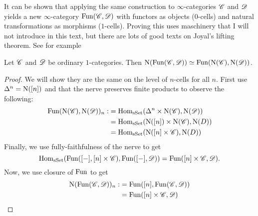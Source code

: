 \documentclass[../../thesis.tex]{subfiles}
\begin{document}
It can be shown that applying the same construction to $\infty$-categories $\mathscr{C}$ and $\mathscr{D}$ yields a new $\infty$-category $\mathrm{Fun}(\mathscr{C}, \mathscr{D})$ with functors as objects ($0$-cells) and natural transformations as morphisms ($1$-cells).
Proving this uses maschinery that I will not introduce in this text, but there are lots of good texts on Joyal's lifting theorem.
See for example 
\begin{proposition}
    Let $\mathscr{C}$ and $\mathscr{D}$ be ordinary $1$-categories.
    Then $\mathrm{N}(\mathrm{Fun}(\mathscr{C}, \mathscr{D})) \simeq \mathrm{Fun}(\mathrm{N}(\mathscr{C}), \mathrm{N}(\mathscr{D}))$.
\end{proposition}
\begin{proof}
    We will show they are the same on the level of $n$-cells for all $n$.
    First use $\Delta^n = \mathrm{N}([n])$ and that the nerve preserves finite products to observe the following:
    \begin{align}
        \mathrm{Fun}(\mathrm{N}(\mathscr{C}), \mathrm{N}(\mathscr{D}))_n: & = \mathrm{Hom}_{\mathrm{sSet}}(\Delta^n \times \mathrm{N}(\mathscr{C}), \mathrm{N}(\mathscr{D}))  \\
                                        & = \mathrm{Hom}_{\mathrm{sSet}}(\mathrm{N}([n])\times \mathrm{N}(\mathscr{C}), \mathrm{N}(D)) \\
                                        & = \mathrm{Hom}_{\mathrm{sSet}}(\mathrm{N}([n]\times \mathscr{C}), \mathrm{N}(D))
    \end{align}
    Finally, we use fully-faithfulness of the nerve to get
    \[
        \mathrm{Hom}_{\mathrm{sSet}}(\mathrm{Fun}([-], [n]\times \mathscr{C}) , \mathrm{Fun}([-], \mathscr{D})) = \mathrm{Fun}([n]\times \mathscr{C}, \mathscr{D}).
    \]
    Now, we use closure of $\mathrm{Fun}$ to get
    \begin{align}
        \mathrm{N}(\mathrm{Fun}(\mathscr{C}, \mathscr{D}))_n: & = \mathrm{Fun}([n], \mathrm{Fun}(\mathscr{C}, \mathscr{D})) \\
                                & = \mathrm{Fun}([n]\times \mathscr{C}, \mathscr{D})
    \end{align}
\end{proof}
\end{document}
